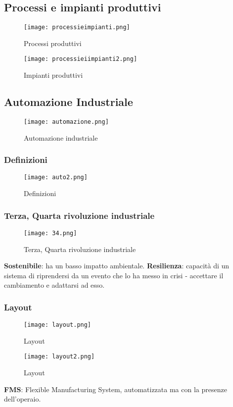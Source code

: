 \documentclass[../main.tex]{subfiles}
\begin{document}
\subsection{Processi e impianti produttivi}
\begin{figure}[h!]
    \centering
    \begin{minipage}[b]{0.45\textwidth}
        \texttt{[image: processieimpianti.png]}
        \caption{Processi produttivi}
    \end{minipage}
    \hfill
    \begin{minipage}[b]{0.45\textwidth}
        \texttt{[image: processieiimpianti2.png]}
        \caption{Impianti produttivi}
    \end{minipage}
\end{figure}

\subsection{Automazione Industriale}
\begin{figure}[h!]
    \centering
    \texttt{[image: automazione.png]}
    \caption{Automazione industriale}
\end{figure}

\subsubsection{Definizioni}
\begin{figure}[h!]
    \centering
    \texttt{[image: auto2.png]}
    \caption{Definizioni}
\end{figure}

\subsubsection{Terza, Quarta rivoluzione industriale}
\begin{figure}[h!]
    \centering
    \texttt{[image: 34.png]}
    \caption{Terza, Quarta rivoluzione industriale}
\end{figure}
\textbf{Sostenibile}: ha un basso impatto ambientale.
\textbf{Resilienza}: capacità di un sistema di riprendersi da un evento che lo ha messo in crisi - accettare il cambiamento e adattarsi ad esso.

\subsubsection{Layout}
\begin{figure}[h!]
    \centering
    \begin{minipage}[b]{0.45\textwidth}
        \texttt{[image: layout.png]}
        \caption{Layout}
    \end{minipage}
    \hfill
    \begin{minipage}[b]{0.45\textwidth}
        \texttt{[image: layout2.png]}
        \caption{Layout}
    \end{minipage}
\end{figure}
\textbf{FMS}: Flexible Manufacturing System, automatizzata ma con la presenze dell'operaio.
\end{document}
